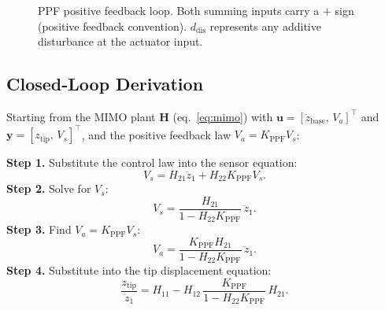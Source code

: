 \documentclass[12pt,a4paper]{article}
\begin{document}
\begin{figure}[h]
\centering
{}
\caption{PPF positive feedback loop.  Both summing inputs carry a $+$ sign
         (positive feedback convention).  $d_\mathrm{dis}$ represents
         any additive disturbance at the actuator input.}
\label{fig:ppf_block}
\end{figure}

\subsection{Closed-Loop Derivation}
\label{sec:ppf_cl}

Starting from the MIMO plant $\mathbf{H}$ (eq.~\eqref{eq:mimo}) with
$\mathbf{u} = [\ddot{z}_\text{base},\, V_a]^\top$ and
$\mathbf{y} = [z_\text{tip},\, V_s]^\top$, and the positive feedback law
$V_a = K_\text{PPF} V_s$:

\textbf{Step 1.} Substitute the control law into the sensor equation:
\begin{equation}
  V_s = H_{21}\ddot{z}_1 + H_{22} K_\text{PPF} V_s.
\end{equation}
\textbf{Step 2.} Solve for $V_s$:
\begin{equation}
  V_s = \frac{H_{21}}{1 - H_{22} K_\text{PPF}}\,\ddot{z}_1.
\end{equation}
\textbf{Step 3.} Find $V_a = K_\text{PPF} V_s$:
\begin{equation}
  V_a = \frac{K_\text{PPF} H_{21}}{1 - H_{22} K_\text{PPF}}\,\ddot{z}_1.
\end{equation}
\textbf{Step 4.} Substitute into the tip displacement equation:
\begin{equation}
  \boxed{\frac{z_\text{tip}}{\ddot{z}_1} =
    H_{11} - H_{12}\,\frac{K_\text{PPF}}{1 - H_{22} K_\text{PPF}}\,H_{21}.}
  \label{eq:ppf_T11}
\end{equation}
\end{document}
